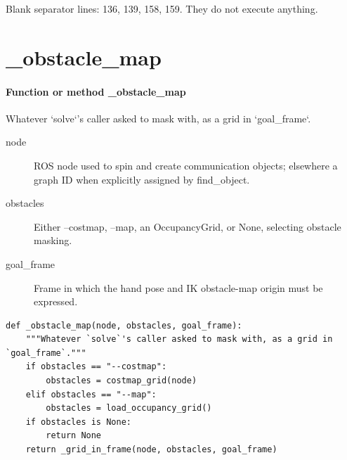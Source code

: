 \documentclass[11pt,a4paper]{book}
\begin{document}
Blank separator lines: 136, 139, 158, 159. They do not execute anything.

\section{\_obstacle\_map}

\paragraph{Function or method \_obstacle\_map}
Whatever `solve`'s caller asked to mask with, as a grid in `goal\_frame`.

\begin{description}
\item[node] ROS node used to spin and create communication objects; elsewhere a graph ID when explicitly assigned by find\_object.
\item[obstacles] Either --costmap, --map, an OccupancyGrid, or None, selecting obstacle masking.
\item[goal\_frame] Frame in which the hand pose and IK obstacle-map origin must be expressed.
\end{description}

\begin{lstlisting}[firstnumber=160]
def _obstacle_map(node, obstacles, goal_frame):
    """Whatever `solve`'s caller asked to mask with, as a grid in `goal_frame`."""
    if obstacles == "--costmap":
        obstacles = costmap_grid(node)
    elif obstacles == "--map":
        obstacles = load_occupancy_grid()
    if obstacles is None:
        return None
    return _grid_in_frame(node, obstacles, goal_frame)


\end{lstlisting}
\end{document}
